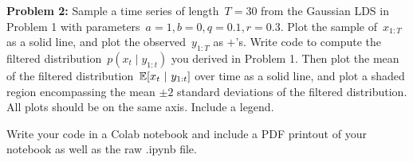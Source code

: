 
\textbf{Problem 2:} Sample a time series of length~$T=30$ from the Gaussian LDS in Problem 1 with parameters~$a=1, b=0, q=0.1, r=0.3$.  Plot the sample of~$x_{1:T}$ as a solid line, and plot the observed~$y_{1:T}$ as $\mathsf{+}$'s.  Write code to compute the filtered distribution~$p(x_t \mid y_{1:t})$ you derived in Problem 1.  Then plot the mean of the filtered distribution~$\mathbb{E}[x_t ~\vert~ y_{1:t}]$ over time as a solid line, and plot a shaded region encompassing the mean $\pm 2$ standard deviations of the filtered distribution.  All plots should be on the same axis.  Include a legend.

Write your code in a Colab notebook and include a PDF printout of your notebook as well as the raw .ipynb file.

